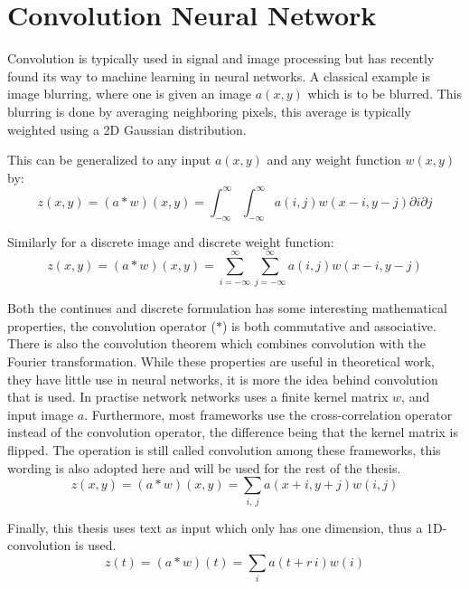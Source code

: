 \section{Convolution Neural Network}

Convolution is typically used in signal and image processing but has recently found its way to machine learning in neural networks. A classical example is image blurring, where one is given an image $a(x, y)$ which is to be blurred. This blurring is done by averaging neighboring pixels, this average is typically weighted using a 2D Gaussian distribution.

This can be generalized to any input $a(x, y)$ and any weight function $w(x, y)$ by:
\begin{equation}
z(x, y) = (a * w)(x, y) = \int_{-\infty}^\infty \int_{-\infty}^\infty a(i, j) w(x - i, y - j) \partial i \partial j
\end{equation}

Similarly for a discrete image and discrete weight function:
\begin{equation}
z(x, y) = (a * w)(x, y) = \sum_{i = -\infty}^\infty \sum_{j = -\infty}^\infty a(i, j) w(x - i, y - j)
\end{equation}

Both the continues and discrete formulation has some interesting mathematical properties, the convolution operator ($*$) is both commutative and associative. There is also the convolution theorem which combines convolution with the Fourier transformation. While these properties are useful in theoretical work, they have little use in neural networks, it is more the idea behind convolution that is used. In practise network networks uses a finite kernel matrix $w$, and input image $a$. Furthermore, most frameworks use the cross-correlation operator instead of the convolution operator, the difference being that the kernel matrix is flipped. The operation is still called convolution among these frameworks, this wording is also adopted here and will be used for the rest of the thesis.
\begin{equation}
z(x, y) = (a * w)(x, y) = \sum_{i,\ j} a(x + i, y + j) w(i, j)
\end{equation}

Finally, this thesis uses text as input which only has one dimension, thus a 1D-convolution is used.
\begin{equation}
z(t) = (a * w)(t) = \sum_{i} a(t+r\,i) w(i)
\end{equation}

